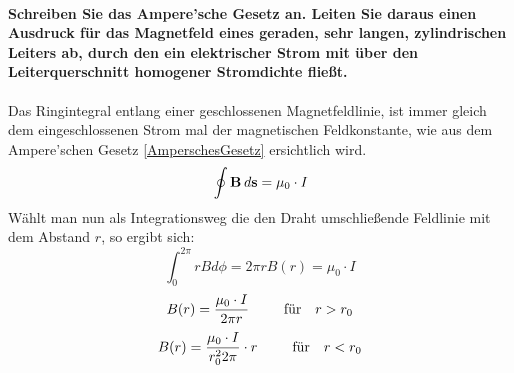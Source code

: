 \documentclass[a4paper, 11pt, ngerman, parskip=half-]{scrartcl}
\begin{document}
\paragraph{Schreiben Sie das Ampere'sche Gesetz an. Leiten Sie daraus einen Ausdruck für das
    Magnetfeld eines geraden, sehr langen, zylindrischen Leiters ab, durch den ein elektrischer Strom
    mit über den Leiterquerschnitt homogener Stromdichte fließt.}
Das Ringintegral entlang einer geschlossenen Magnetfeldlinie, ist immer gleich dem eingeschlossenen Strom mal der magnetischen Feldkonstante,
wie aus dem Ampere'schen Gesetz \ref{AmperschesGesetz} ersichtlich wird.
\begin{equation} \\
    \oint \textbf{B} \hspace{0.2em} d\textbf{s} = \mu_0\cdot I
\end{equation}
Wählt man nun als Integrationsweg die den Draht umschließende Feldlinie mit dem Abstand $r$, so ergibt sich:
\begin{equation}
    \int_{0}^{2\pi} rBd\phi = 2 \pi r B(r) = \mu_0\cdot I
\end{equation}
\begin{equation}
    B(r) = \frac{\mu_0\cdot I}{2 \pi r} \hspace{2.5em} \text{für} \hspace{1em} r > r_0
\end{equation}
\begin{equation}
    B(r) = \frac{\mu_0\cdot I}{r_{0}^{2} 2 \pi} \cdot r  \hspace{2.5em} \text{für} \hspace{1em} r < r_0
\end{equation}
\end{document}
